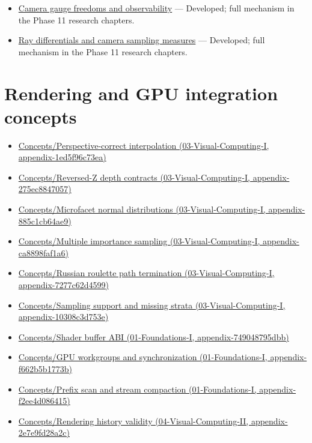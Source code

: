 \begin{itemize}
\tightlist
\item
  \hyperref[appendix-113f0267e5f4]{Camera gauge freedoms and observability} --- Developed; full mechanism in the Phase 11 research chapters.
\item
  \hyperref[appendix-8c40fad29462]{Ray differentials and camera sampling measures} --- Developed; full mechanism in the Phase 11 research chapters.
\end{itemize}

\section{Rendering and GPU integration concepts}\label{appendix-a6d556a4ef50-rendering-and-gpu-integration-concepts}

\begin{itemize}
\tightlist
\item
  \href{../03-Visual-Computing-I/main.pdf\#nameddest=appendix-1ed5f96c73ea}{Concepts/Perspective-correct interpolation (03-Visual-Computing-I, appendix-1ed5f96c73ea)}
\item
  \href{../03-Visual-Computing-I/main.pdf\#nameddest=appendix-275ec8847057}{Concepts/Reversed-Z depth contracts (03-Visual-Computing-I, appendix-275ec8847057)}
\item
  \href{../03-Visual-Computing-I/main.pdf\#nameddest=appendix-885c1cb64ae9}{Concepts/Microfacet normal distributions (03-Visual-Computing-I, appendix-885c1cb64ae9)}
\item
  \href{../03-Visual-Computing-I/main.pdf\#nameddest=appendix-ca8898faf1a6}{Concepts/Multiple importance sampling (03-Visual-Computing-I, appendix-ca8898faf1a6)}
\item
  \href{../03-Visual-Computing-I/main.pdf\#nameddest=appendix-7277c62d4599}{Concepts/Russian roulette path termination (03-Visual-Computing-I, appendix-7277c62d4599)}
\item
  \href{../03-Visual-Computing-I/main.pdf\#nameddest=appendix-10308c3d753e}{Concepts/Sampling support and missing strata (03-Visual-Computing-I, appendix-10308c3d753e)}
\item
  \href{../01-Foundations-I/main.pdf\#nameddest=appendix-749048795dbb}{Concepts/Shader buffer ABI (01-Foundations-I, appendix-749048795dbb)}
\item
  \href{../01-Foundations-I/main.pdf\#nameddest=appendix-f662b5b1773b}{Concepts/GPU workgroups and synchronization (01-Foundations-I, appendix-f662b5b1773b)}
\item
  \href{../01-Foundations-I/main.pdf\#nameddest=appendix-f2ee4d086415}{Concepts/Prefix scan and stream compaction (01-Foundations-I, appendix-f2ee4d086415)}
\item
  \href{../04-Visual-Computing-II/main.pdf\#nameddest=appendix-2e7e9fd28a2c}{Concepts/Rendering history validity (04-Visual-Computing-II, appendix-2e7e9fd28a2c)}
\end{itemize}

